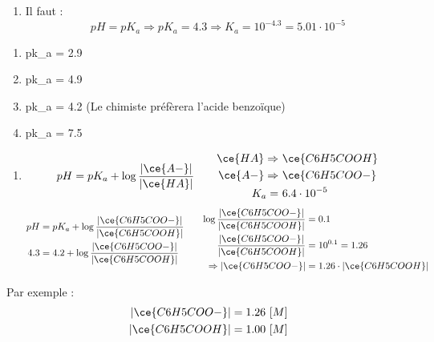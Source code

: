 \documentclass[
  11pt,
  french,
  a4paper,
  openany]{book}
\providecommand{\tightlist}{%
  \setlength{\itemsep}{0pt}\setlength{\parskip}{0pt}}
\begin{document}
\begin{Answer}

\begin{enumerate}
\def\labelenumi{\arabic{enumi}.}
\tightlist
\item
  Il faut :
  \[
  pH = pK_a \Rightarrow pK_a = 4.3 \Rightarrow K_a = 10^{-4.3} = 5.01 \cdot 10^{-5}
  \]
\end{enumerate}

\begin{enumerate}
\def\labelenumi{\alph{enumi}.}
\tightlist
\item
  pk\_a = 2.9
\item
  pk\_a = 4.9
\item
  pk\_a = 4.2 (Le chimiste préfèrera l'acide benzoïque)
\item
  pk\_a = 7.5
\end{enumerate}

\begin{enumerate}
\def\labelenumi{\arabic{enumi}.}
\setcounter{enumi}{1}
\tightlist
\item
  \[
  \begin{split}
    pH = pK_a + \log \frac{|\ce{A-}|}{|\ce{HA}|}
  \end{split}
  \qquad
  \begin{split}
    \ce{HA} \Rightarrow &\ \ce{C6H5COOH} \\
    \ce{A-} \Rightarrow &\ \ce{C6H5COO-} \\
    K_a = &\ 6.4 \cdot 10^{-5}
  \end{split}
  \]
  \[
  \begin{split}
    pH &= pK_a + \log \frac{|\ce{C6H5COO-}|}{|\ce{C6H5COOH}|} \\
    4.3 &= 4.2 + \log \frac{|\ce{C6H5COO-}|}{|\ce{C6H5COOH}|}
  \end{split}
  \qquad
  \begin{split}
    \log \frac{|\ce{C6H5COO-}|}{|\ce{C6H5COOH}|} &= 0.1 \\
    \frac{|\ce{C6H5COO-}|}{|\ce{C6H5COOH}|} &= 10^{0.1} = 1.26 \\
    \Rightarrow |\ce{C6H5COO-}| &= 1.26 \cdot |\ce{C6H5COOH}|
  \end{split}
  \]
\end{enumerate}

Par exemple :
\[
\begin{split}
|\ce{C6H5COO-}| &= 1.26\ [M] \\
|\ce{C6H5COOH}| &= 1.00\ [M]
\end{split}
\]


\end{Answer}
\end{document}
